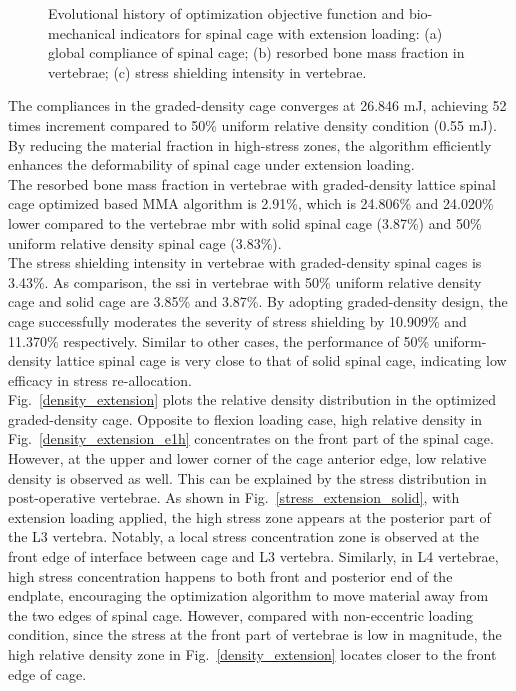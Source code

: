 \documentclass[12pt]{extbook}
\begin{document}
\begin{figure}[htbp]
\centering
{}
\caption{Evolutional history of optimization objective function and bio-mechanical indicators for spinal cage with extension loading: (a) global compliance of spinal cage; (b) resorbed bone mass fraction in vertebrae; (c) stress shielding intensity in vertebrae.}
\label{history_extension}
\end{figure}

The compliances in the graded-density cage converges at 26.846 mJ, achieving 52 times increment compared to 50\% uniform relative density condition (0.55 mJ). By reducing the material fraction in high-stress zones, the algorithm efficiently enhances the deformability of spinal cage under extension loading.\\

The resorbed bone mass fraction in vertebrae with graded-density lattice spinal cage optimized based MMA algorithm is 2.91\%, which is 24.806\% and 24.020\% lower compared to the vertebrae mbr with solid spinal cage (3.87\%) and 50\% uniform relative density spinal cage (3.83\%).\\

The stress shielding intensity in vertebrae with graded-density spinal cages is 3.43\%. As comparison, the ssi in vertebrae with 50\% uniform relative density cage and solid cage are 3.85\% and 3.87\%. By adopting graded-density design, the cage successfully moderates the severity of stress shielding by 10.909\% and 11.370\% respectively. Similar to other cases, the performance of 50\% uniform-density lattice spinal cage is very close to that of solid spinal cage, indicating low efficacy in stress re-allocation.\\

Fig.~\ref{density_extension} plots the relative density distribution in the optimized graded-density cage. Opposite to flexion loading case, high relative density in Fig.~\ref{density_extension_e1h} concentrates on the front part of the spinal cage. However, at the upper and lower corner of the cage anterior edge, low relative density is observed as well. This can be explained by the stress distribution in post-operative vertebrae. As shown in Fig.~\ref{stress_extension_solid}, with extension loading applied, the high stress zone appears at the posterior part of the L3 vertebra. Notably, a local stress concentration zone is observed at the front edge of interface between cage and L3 vertebra. Similarly, in L4 vertebrae, high stress concentration happens to both front and posterior end of the endplate, encouraging the optimization algorithm to move material away from the two edges of spinal cage. However, compared with non-eccentric loading condition, since the stress at the front part of vertebrae is low in magnitude, the high relative density zone in Fig.~\ref{density_extension} locates closer to the front edge of cage.\\
\end{document}
